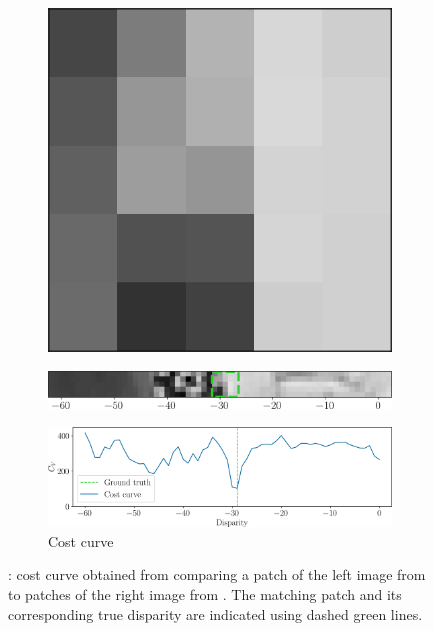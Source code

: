 \begin{figure}
    \centering
    \begin{subfigure}[t]{0.073\linewidth}
        \centering
        \includegraphics[width=\linewidth]{Images/Chap_5/tuto_left_patch.png}
        \caption{}
        \label{fig:tuto_a}
    \end{subfigure}
    \hfill\begin{subfigure}[t]{\linewidth}
        \flushright
        \includegraphics[width=0.927\linewidth]{Images/Chap_5/tuto_right_patch.png}
        \caption{}
        \label{fig:tuto_b}
    \end{subfigure}
    \begin{subfigure}[t]{\linewidth}
        \centering
        \includegraphics[width=\linewidth]{Images/Chap_5/tuto_cost_curve.png}
        \caption{Cost curve}
        \label{fig:tuto_c}
    \end{subfigure}
    \caption{: cost curve obtained from comparing a patch of the left image from  to patches of the right image from . The matching patch and its corresponding true disparity are indicated using dashed green lines.}
    \label{fig:tuto_dense_matching}
\end{figure}

